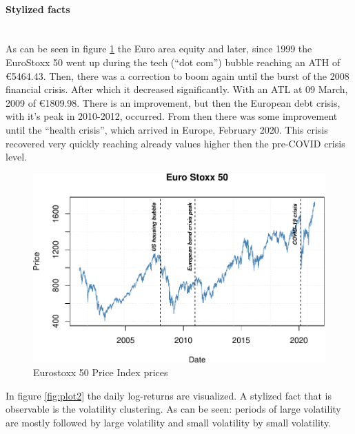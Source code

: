 \documentclass[a4paper, twoside]{templates/ociamthesis}
\begin{document}
\hypertarget{stylized-facts}{%
\paragraph{Stylized facts}\label{stylized-facts}}

~\\
As can be seen in figure \ref{fig:plot1} the Euro area equity and later, since 1999 the EuroStoxx 50 went up during the tech (``dot com'') bubble reaching an ATH of €5464.43. Then, there was a correction to boom again until the burst of the 2008 financial crisis. After which it decreased significantly. With an ATL at 09 March, 2009 of €1809.98. There is an improvement, but then the European debt crisis, with it's peak in 2010-2012, occurred. From then there was some improvement until the ``health crisis'', which arrived in Europe, February 2020. This crisis recovered very quickly reaching already values higher then the pre-COVID crisis level.

\begin{figure}[h]

{\centering \includegraphics[width=1\linewidth]{_main_files/figure-latex/plot1-1} 

}

\caption{Eurostoxx 50 Price Index prices}\label{fig:plot1}
\end{figure}

\newpage

In figure \ref{fig:plot2} the daily log-returns are visualized. A stylized fact that is observable is the volatility clustering. As can be seen: periods of large volatility are mostly followed by large volatility and small volatility by small volatility.
\end{document}
